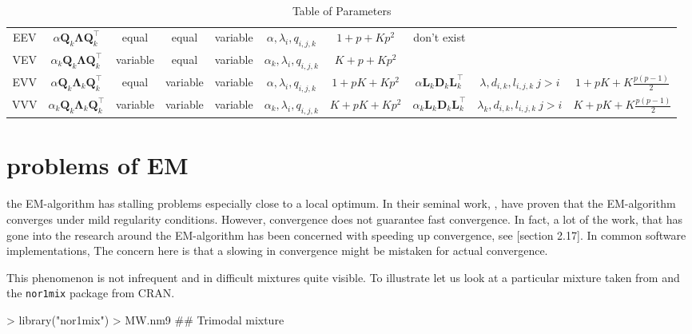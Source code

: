 \begin{table}[!htb]
{\begin{tabular}{| c | c c c c c c | c c c |}
        EEV    & $ \alpha \pmb{Q}_k \pmb{\Lambda} \pmb{Q}_k^\top $ &equal & equal & variable & $ \alpha, \lambda_{i}, q_{i,j,k} $ & $ 1+p+Kp^2 $ &  don't exist  & & \\
        VEV    & $ \alpha_k \pmb{Q}_k \pmb{\Lambda} \pmb{Q}_k^\top $ &variable & equal & variable & $ \alpha_k, \lambda_{i}, q_{i,j,k} $ & $ K+p+Kp^2 $ & & & \\
        \hline
        EVV    & $ \alpha \pmb{Q}_k \pmb{\Lambda}_k \pmb{Q}_k^\top $ & equal & variable & variable & $ \alpha, \lambda_{i}, q_{i,j,k} $ & $ 1+pK+Kp^2 $ & $ \alpha \pmb{L}_k \pmb{D}_k \pmb{L}_k^\top $ & $ \lambda, d_{i,k}, l_{i,j,k}\ j>i $ & $ 1+pK+K\frac{p(p-1)}{2} $ \\
        VVV    & $ \alpha_k \pmb{Q}_k \pmb{\Lambda}_k \pmb{Q}_k^\top $ & variable & variable & variable & $ \alpha_k, \lambda_{i}, q_{i,j,k} $ & $ K+pK+Kp^2 $ & $ \alpha_k \pmb{L}_k \pmb{D}_k \pmb{L}_k^\top $ & $ \lambda_k, d_{i,k}, l_{i,j,k}\ j>i $ & $ K+pK+K\frac{p(p-1)}{2} $ \\
        \hline
    \end{tabular}

}

\caption{Table of Parameters}
\label{table:param}
\end{table}

\clearpage


\section{problems of EM}


the EM-algorithm has stalling problems especially close to a local optimum.
In their seminal work, \cite{Dem77}, have proven that the EM-algorithm 
converges under mild regularity conditions. 
However, convergence does not guarantee fast convergence. In fact, a lot of 
the work, that has gone into the research around the EM-algorithm has been 
concerned with speeding up convergence, see \cite{McL00}[section 2.17].
In common software implementations, %
The concern here is that a slowing in convergence might be mistaken for actual
convergence.

This phenomenon is not infrequent and in difficult mixtures quite visible.
To illustrate let us look at a particular mixture taken from \cite{Mar92} and
the {\tt nor1mix} package from CRAN.

\begin{Schunk}
\begin{Sinput}
> library("nor1mix")
> MW.nm9 ## Trimodal mixture
\end{Sinput}
\end{Schunk}


